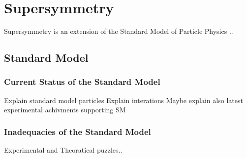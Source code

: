 \chapter{Supersymmetry}
Supersymmetry is an extension of the Standard Model of Particle Physics ..
\section{Standard Model}
\label{sec:StandardModel}
\subsection{Current Status of the Standard Model}
Explain standard model particles
Explain interations
Maybe explain also latest experimental achivments supporting SM
\subsection{Inadequacies of the Standard Model}
Experimental and Theoratical puzzles..



